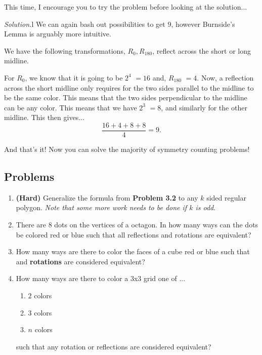 \documentclass[11pt]{scrartcl}
\begin{document}
This time, I encourage you to try the problem before looking at the solution...

\newpage

\color{orange} \textit{Solution.}\color{black}\color{white}l\color{black} We can again bash out possibilities to get $9$, however Burnside's Lemma is arguably more intuitive.

We have the following transformations, $R_0, R_{180}$, reflect across the short or long midline.

For $R_0$, we know that it is going to be $2^4$ \boldmath $= 16$ \unboldmath and, $R_{180}$ \boldmath $= 4$\unboldmath. Now, a reflection across the short midline only requires for the two sides parallel to the midline to be the same color. This means that the two sides perpendicular to the midline can be any color. This means that we have $2^3$ \boldmath $= 8$\unboldmath, and similarly for the other midline. This then gives...$$\dfrac{16+4+8+8}{4} = \boxed{9}.$$

And that's it! Now you can solve the majority of symmetry counting problems!

\subsection{Problems}
\begin{enumerate}
    \item \textbf{(Hard)} Generalize the formula from \color{red} \textbf{Problem 3.2} \color{black} to any $k$ sided regular polygon. \textit{Note that some more work needs to be done if $k$ is odd}.
    \item There are $8$ dots on the vertices of a octagon. In how many ways can the dots be colored red or blue such that all reflections and rotations are equivalent?
    \item How many ways are there to color the faces of a cube red or blue such that and \color{blue} \textbf{rotations} \color{black} are considered equivalent?
    \item How many ways are there to color a $3$x$3$ grid one of ...
    \begin{enumerate}
        \item $2$ colors
        \item $3$ colors
        \item $n$ colors
    \end{enumerate}
    such that any rotation or reflections are considered equivalent?
\end{enumerate}
\end{document}

